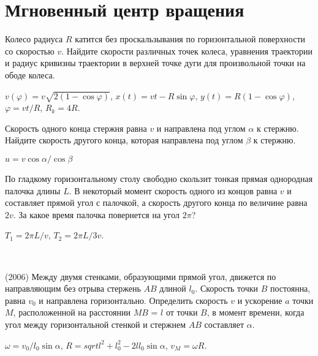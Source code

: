 \section{Мгновенный центр вращения}

\begin{ex}
Колесо радиуса $R$ катится без проскальзывания по горизонтальной поверхности со скоростью $v$. 
Найдите скорости различных точек колеса, уравнения траектории и радиус кривизны траектории в верхней точке дуги для произвольной точки на ободе колеса.
\begin{ans}
$v(\varphi) = v\sqrt{2(1- \cos \varphi)}$, $x(t) = vt - R \sin \varphi$, $y(t) = R(1 - \cos \varphi)$, $\varphi = vt / R$, $R_k = 4R$.
\end{ans}
\end{ex}

\begin{ex}
Скорость одного конца стержня равна $v$ и направлена под углом $\alpha$ к стержню. Найдите скорость другого конца, которая направлена под углом $\beta$ к стержню.
\begin{ans}
$u = v \cos \alpha / \cos \beta$
\end{ans}
\end{ex}

\begin{ex}
По гладкому горизонтальному столу свободно скользит тонкая прямая однородная палочка длины $L$. 
В некоторый момент скорость одного из концов равна $v$ и составляет прямой угол с палочкой, 
а скорость другого конца по величине равна $2v$. За какое время палочка повернется на угол $2\pi$?
\begin{ans}
$T_1 = 2 \pi L/v$, $T_2 = 2 \pi L/3v$.
\end{ans}
\end{ex}

\begin{ex}
\hspace{0pt} \\
\begin{minipage}{.65\textwidth}
(2006) Между двумя стенками, образующими прямой угол, движется по направляющим без отрыва стержень $AB$ длиной $l_0$. 
Скорость точки $B$ постоянна, равна $v_0$ и направлена горизонтально. Определить скорость $v$ и ускорение $a$ точки $M$, расположенной на расстоянии $MB$ = $l$ от точки $B$, в момент времени, когда угол между горизонтальной стенкой и стержнем $AB$ составляет $\alpha$.
\end{minipage}
\begin{minipage}{.35\textwidth}
\centering

\end{minipage}
\begin{ans}
$\omega = v_0/l_0 \sin \alpha$, $R = sqrt{l^2 + l_0^2 - 2ll_0 \sin \alpha}$, $v_M = \omega R$.
\end{ans}
\end{ex}

